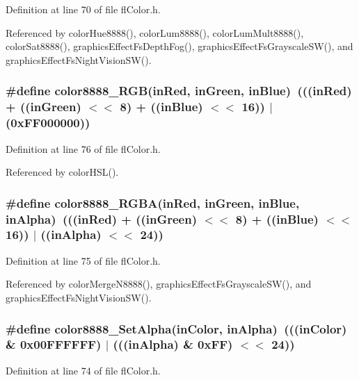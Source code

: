 Definition at line 70 of file fl\-Color.h.

Referenced by color\-Hue8888(), color\-Lum8888(), color\-Lum\-Mult8888(), color\-Sat8888(), graphics\-Effect\-Fs\-Depth\-Fog(), graphics\-Effect\-Fs\-Grayscale\-SW(), and graphics\-Effect\-Fs\-Night\-Vision\-SW().
\subsubsection{\setlength{\rightskip}{0pt plus 5cm}\#define color8888\_\-RGB(in\-Red, in\-Green, in\-Blue)~(((in\-Red) + ((in\-Green) $<$$<$ 8) + ((in\-Blue) $<$$<$ 16)) $|$ (0x\-FF000000))}\label{flColor_8h_fcc66ea3401039c04a5ad4065c41f81a}




Definition at line 76 of file fl\-Color.h.

Referenced by color\-HSL().
\subsubsection{\setlength{\rightskip}{0pt plus 5cm}\#define color8888\_\-RGBA(in\-Red, in\-Green, in\-Blue, in\-Alpha)~(((in\-Red) + ((in\-Green) $<$$<$ 8) + ((in\-Blue) $<$$<$ 16)) $|$ ((in\-Alpha) $<$$<$ 24))}\label{flColor_8h_c6df7fc369067e03da31777b47aba268}




Definition at line 75 of file fl\-Color.h.

Referenced by color\-Merge\-N8888(), graphics\-Effect\-Fs\-Grayscale\-SW(), and graphics\-Effect\-Fs\-Night\-Vision\-SW().
\subsubsection{\setlength{\rightskip}{0pt plus 5cm}\#define color8888\_\-Set\-Alpha(in\-Color, in\-Alpha)~(((in\-Color) \& 0x00FFFFFF) $|$ (((in\-Alpha) \& 0x\-FF) $<$$<$ 24))}\label{flColor_8h_1bde3a7888d1058047b7d572fcbaccd9}




Definition at line 74 of file fl\-Color.h.

